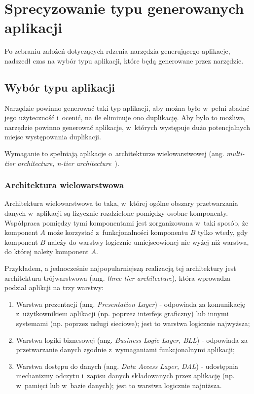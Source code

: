 \chapter{Sprecyzowanie typu generowanych aplikacji} \label{chap:generated_app_type}

Po zebraniu założeń dotyczących rdzenia narzędzia generującego aplikacje, nadszedł czas na wybór typu aplikacji, które będą generowane przez narzędzie.



\section{Wybór typu aplikacji}

Narzędzie powinno generować taki typ aplikacji, aby można było w~pełni zbadać jego użyteczność i~ocenić, na ile eliminuje ono duplikację.
Aby było to możliwe, narzędzie powinno generować aplikacje, w~których występuje dużo potencjalnych miejsc występowania duplikacji.

Wymaganie to spełniają aplikacje o~architekturze wielowarstwowej (ang. \emph{multi-tier architecture, n-tier architecture}~\cite{ntier}).


\subsection{Architektura wielowarstwowa}

Architektura wielowarstwowa to taka, w~której ogólne obszary przetwarzania danych w~aplikacji są fizycznie rozdzielone pomiędzy osobne komponenty.
Współpraca pomiędzy tymi komponentami jest zorganizowana w~taki sposób, że komponent $A$ może korzystać z~funkcjonalności komponentu $B$ tylko wtedy, gdy komponent $B$ należy do warstwy logicznie umiejscowionej nie wyżej niż warstwa, do której należy komponent $A$.

Przykładem, a jednocześnie najpopularniejszą realizacją tej architektury jest architektura trójwarstwowa (ang. \emph{three-tier architecture}), która wprowadza podział aplikcji na trzy warstwy:

\begin{enumerate}
 \item Warstwa prezentacji (ang. \emph{Presentation Layer}) - odpowiada za komunikację z~użytkownikiem aplikacji (np. poprzez interfejs graficzny) lub innymi systemami (np. poprzez usługi sieciowe); jest to warstwa logicznie najwyższa;
 \item Warstwa logiki biznesowej (ang. \emph{Business Logic Layer, BLL}) - odpowiada za przetwarzanie danych zgodnie z~wymaganiami funkcjonalnymi aplikacji;
 \item Warstwa dostępu do danych (ang. \emph{Data Access Layer, DAL}) - udostępnia mechanizmy odczytu i~zapisu danych składowanych przez aplikację (np. w~pamięci lub w~bazie danych); jest to warstwa logicznie najniższa.
\end{enumerate}

